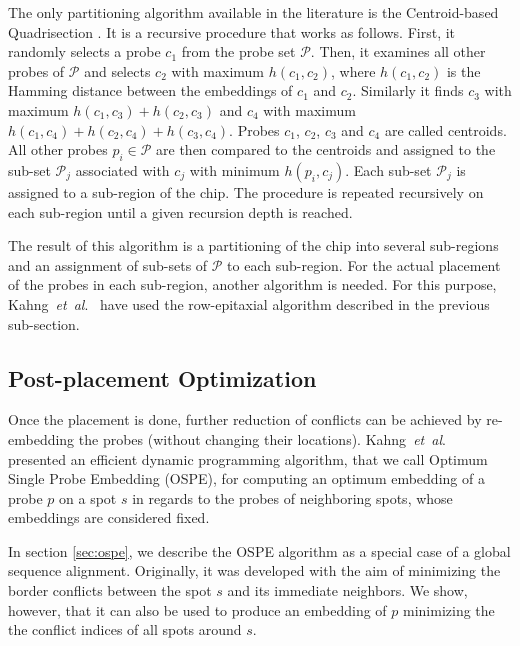 \documentclass{llncs}
\begin{document}
The only partitioning algorithm available in the literature is the Centroid-based
Quadrisection \cite{KAHNG03B}. It is a recursive procedure that works as follows.
First, it randomly selects a probe $c_1$ from the probe set $\mathcal{P}$. Then,
it examines all other probes of $\mathcal{P}$ and selects $c_2$ with maximum
$h(c_1,c_2)$, where $h(c_1,c_2)$ is the Hamming distance between the embeddings
of $c_1$ and $c_2$. Similarly it finds $c_3$ with maximum $h(c_1,c_3) + h(c_2,c_3)$
and $c_4$ with maximum $h(c_1,c_4) + h(c_2,c_4) + h(c_3,c_4)$. Probes
$c_1$, $c_2$, $c_3$ and $c_4$ are called centroids. All other probes
$p_i \in \mathcal{P}$ are then compared to the centroids and assigned to the sub-set
$\mathcal{P}_j$ associated with $c_j$ with minimum $h(p_i,c_j)$. Each sub-set
$\mathcal{P}_j$ is assigned to a sub-region of the chip. The procedure is repeated
recursively on each sub-region until a given recursion depth is reached.

The result of this algorithm is a partitioning of the chip into several sub-regions
and an assignment of sub-sets of $\mathcal{P}$ to each sub-region. For the actual
placement of the probes in each sub-region, another algorithm is needed. For this
purpose, Kahng~{\it et~al}.~\cite{KAHNG03B} have used the row-epitaxial algorithm
described in the previous sub-section.

\subsection{Post-placement Optimization}
\label{sec:optimization}

Once the placement is done, further reduction of conflicts can be
achieved by re-embedding the probes (without changing their locations).
Kahng~{\it et~al}.~\cite{KAHNG02} presented an efficient dynamic programming
algorithm, that we call Optimum Single Probe Embedding (OSPE), for computing an
optimum embedding of a probe $p$ on a spot $s$ in regards to the probes of
neighboring spots, whose embeddings are considered fixed.

In section \ref{sec:ospe}, we describe the OSPE algorithm as a special case of a
global sequence alignment. Originally, it was developed with the aim of minimizing
the border conflicts between the spot $s$ and its immediate neighbors. We show,
however, that it can also be used to produce an embedding of $p$ minimizing the
the conflict indices of all spots around $s$.
\end{document}
